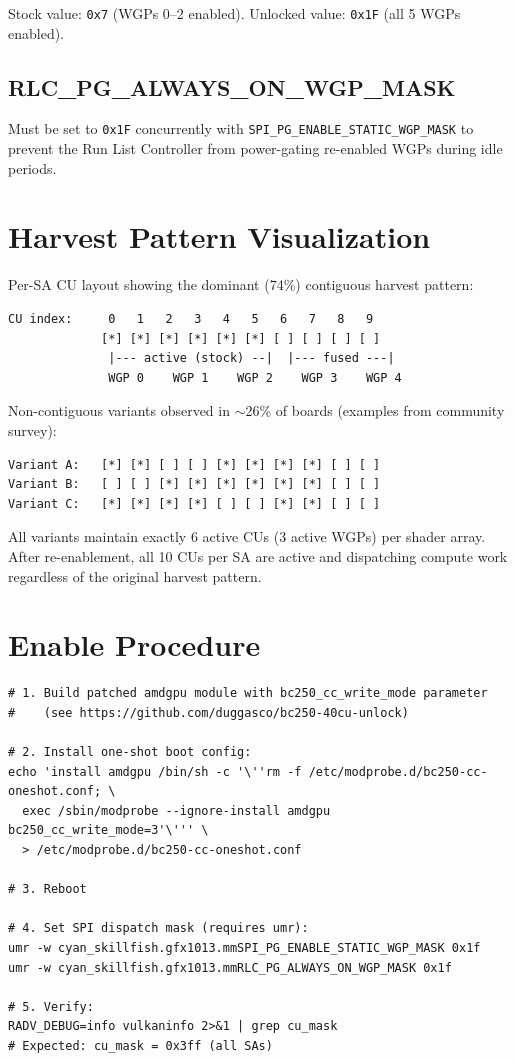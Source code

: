 \documentclass[11pt,twocolumn]{article}
\begin{document}
Stock value: \texttt{0x7} (WGPs 0--2 enabled). Unlocked value: \texttt{0x1F} (all 5 WGPs enabled).

\subsection*{RLC\_PG\_ALWAYS\_ON\_WGP\_MASK}

Must be set to \texttt{0x1F} concurrently with \texttt{SPI\_PG\_ENABLE\_STATIC\_WGP\_MASK} to prevent the Run List Controller from power-gating re-enabled WGPs during idle periods.

\section{Harvest Pattern Visualization}

Per-SA CU layout showing the dominant (74\%) contiguous harvest pattern:

\begin{lstlisting}
CU index:     0   1   2   3   4   5   6   7   8   9
             [*] [*] [*] [*] [*] [*] [ ] [ ] [ ] [ ]
              |--- active (stock) --|  |--- fused ---|
              WGP 0    WGP 1    WGP 2    WGP 3    WGP 4
\end{lstlisting}

Non-contiguous variants observed in $\sim$26\% of boards (examples from community survey):
\begin{lstlisting}
Variant A:   [*] [*] [ ] [ ] [*] [*] [*] [*] [ ] [ ]
Variant B:   [ ] [ ] [*] [*] [*] [*] [*] [*] [ ] [ ]
Variant C:   [*] [*] [*] [*] [ ] [ ] [*] [*] [ ] [ ]
\end{lstlisting}

All variants maintain exactly 6 active CUs (3 active WGPs) per shader array. After re-enablement, all 10 CUs per SA are active and dispatching compute work regardless of the original harvest pattern.

\section{Enable Procedure}

\begin{lstlisting}
# 1. Build patched amdgpu module with bc250_cc_write_mode parameter
#    (see https://github.com/duggasco/bc250-40cu-unlock)

# 2. Install one-shot boot config:
echo 'install amdgpu /bin/sh -c '\''rm -f /etc/modprobe.d/bc250-cc-oneshot.conf; \
  exec /sbin/modprobe --ignore-install amdgpu bc250_cc_write_mode=3'\''' \
  > /etc/modprobe.d/bc250-cc-oneshot.conf

# 3. Reboot

# 4. Set SPI dispatch mask (requires umr):
umr -w cyan_skillfish.gfx1013.mmSPI_PG_ENABLE_STATIC_WGP_MASK 0x1f
umr -w cyan_skillfish.gfx1013.mmRLC_PG_ALWAYS_ON_WGP_MASK 0x1f

# 5. Verify:
RADV_DEBUG=info vulkaninfo 2>&1 | grep cu_mask
# Expected: cu_mask = 0x3ff (all SAs)
\end{lstlisting}
\end{document}
